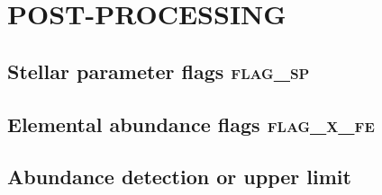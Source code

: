 \documentclass[
  journal=pasa,
  manuscript=research-paper, %
  year=2021,
  volume=37
]{cup-journal}
\begin{document}

\newpage
\section{POST-PROCESSING}
\label{sec:post_processing}

\subsection{Stellar parameter flags \textsc{flag\_sp}}
\label{sec:flag_sp}


\subsection{Elemental abundance flags \textsc{flag\_x\_fe}}
\label{sec:flag_x_fe}



\subsection{Abundance detection or upper limit}
\label{sec:abundance_detection_or_upper_limit}
\end{document}
